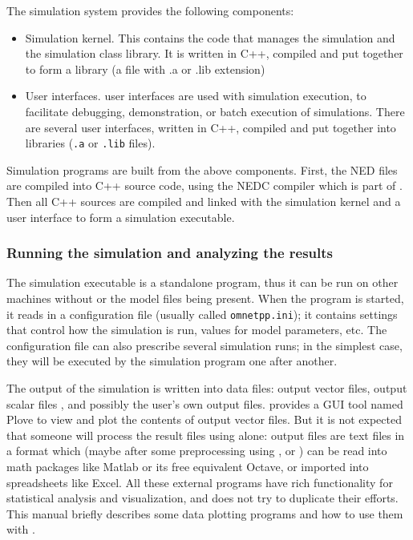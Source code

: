 The simulation system provides the following components:
\begin{itemize}
  \item{Simulation kernel. This contains the
    code that manages the simulation and the simulation class library.
    It is written in C++, compiled and put together to form a library
    (a file with .a or .lib extension)}
  \item{User interfaces.
     {\opp} user interfaces
    are used with simulation execution, to facilitate debugging,
    demonstration, or batch execution of simulations. There are
    several user interfaces, written in C++, compiled and put together
    into libraries (\texttt{.a} or \texttt{.lib} files).}
\end{itemize}


Simulation programs are built from the above components. First, the
NED files are compiled into C++ source code, using
the NEDC compiler which is part of {\opp}. Then
all C++ sources are compiled and linked with the simulation kernel and
a user interface to form a simulation executable.


\subsubsection{Running the simulation and analyzing the results}

The simulation executable is a standalone program,
thus it can be run on other machines without {\opp} or the model files
being present. When the program is started, it reads in a configuration
file (usually called
\texttt{omnetpp.ini}); it contains settings that
control how the simulation is run, values for model parameters, etc.
The configuration file can also prescribe several simulation runs; in
the simplest case, they will be executed by the simulation program one
after another.

The output of the simulation is written into data files: output vector
files, output scalar files
, and possibly the user's own output files.
{\opp} provides a GUI tool named Plove to view and plot the contents
of output vector files. But it is not expected that someone will
process the result files using {\opp} alone: output files are text
files in a format which (maybe after some preprocessing using
,  or ) can be read into math
packages like Matlab or its free equivalent Octave, or imported into
spreadsheets like Excel. All these external programs have rich
functionality for statistical analysis and visualization, and {\opp}
does not try to duplicate their efforts. This manual briefly describes
some data plotting programs and how to use them with {\opp}.


